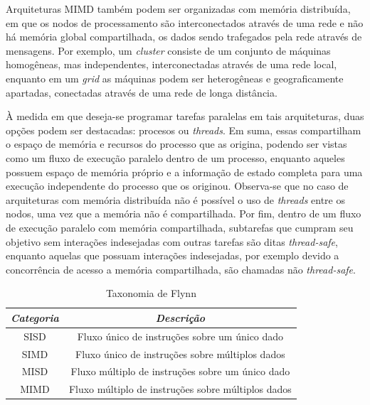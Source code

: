 \documentclass[cic,tc]{iiufrgs}
\begin{document}
Arquiteturas MIMD também podem ser organizadas com memória distribuída, em que
os nodos de processamento são interconectados através de uma rede e não há
memória global compartilhada, os dados sendo trafegados pela rede através de
mensagens. Por exemplo, um \textit{cluster} consiste de um conjunto de máquinas
homogêneas, mas independentes, interconectadas através de uma rede local,
enquanto em um \textit{grid} as máquinas podem ser heterogêneas e
geograficamente apartadas, conectadas através de uma rede de longa distância.

À medida em que deseja-se programar tarefas paralelas em tais arquiteturas,
duas opções podem ser destacadas: procesos ou \textit{threads}. Em suma, essas
compartilham o espaço de memória e recursos do processo que as origina, podendo
ser vistas como um fluxo de execução paralelo dentro de um processo, enquanto
aqueles possuem espaço de memória próprio e a informação de estado completa
para uma execução independente do processo que os originou. Observa-se que no
caso de arquiteturas com memória distribuída não é possível o uso de
\textit{threads} entre os nodos, uma vez que a memória não é compartilhada.
Por fim, dentro de um fluxo de execução paralelo com memória compartilhada,
subtarefas que cumpram seu objetivo sem interações indesejadas com outras
tarefas são ditas \textit{thread-safe}, enquanto aquelas que possuam interações
indesejadas, por exemplo devido a concorrência de acesso a memória
compartilhada, são chamadas não \textit{thread-safe}.

\begin{table}[h]
    \caption{Taxonomia de Flynn}
    \centering
        \begin{tabular}{c|c}
          \hline
          \textit{Categoria}  &   \textit{Descrição} \\
          \hline
          \hline
          SISD & Fluxo único de instruções sobre um único dado \\
          SIMD & Fluxo único de instruções sobre múltiplos dados \\
          MISD & Fluxo múltiplo de instruções sobre um único dado \\
          MIMD & Fluxo múltiplo de instruções sobre múltiplos dados \\
          \hline
        \end{tabular}
    \label{tbl:flynn}
\end{table}
\end{document}
